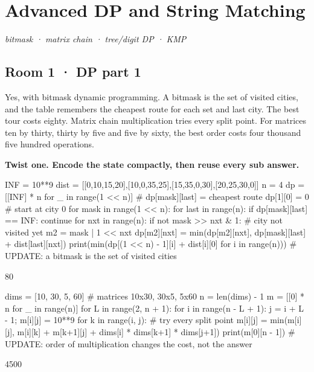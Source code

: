 \documentclass[11pt,a4paper]{report}
\begin{document}
\chapter{Advanced DP and String Matching}
\textit{bitmask · matrix chain · tree/digit DP · KMP}
\section*{Room 1 · DP part 1}
Yes, with bitmask dynamic programming. A bitmask is the set of visited cities, and the table remembers the cheapest route for each set and last city. The best tour costs eighty. Matrix chain multiplication tries every split point. For matrices ten by thirty, thirty by five and five by sixty, the best order costs four thousand five hundred operations.
\begin{tcolorbox}[colback=yellow!12,colframe=orange!70!black,boxrule=0.4pt,left=4pt,right=4pt,top=2pt,bottom=2pt]\textbf{Twist one. Encode the state compactly, then reuse every sub answer.}\end{tcolorbox}
\begin{Code}
INF = 10**9
dist = [[0,10,15,20],[10,0,35,25],[15,35,0,30],[20,25,30,0]]
n = 4
dp = [[INF] * n for _ in range(1 << n)]     # dp[mask][last] = cheapest route
dp[1][0] = 0                                # start at city 0
for mask in range(1 << n):
    for last in range(n):
        if dp[mask][last] == INF: continue
        for nxt in range(n):
            if not mask >> nxt & 1:         # city not visited yet
                m2 = mask | 1 << nxt
                dp[m2][nxt] = min(dp[m2][nxt], dp[mask][last] + dist[last][nxt])
print(min(dp[(1 << n) - 1][i] + dist[i][0] for i in range(n)))
# UPDATE: a bitmask is the set of visited cities
\end{Code}
\begin{Out}
80
\end{Out}
\begin{Code}
dims = [10, 30, 5, 60]                      # matrices 10x30, 30x5, 5x60
n = len(dims) - 1
m = [[0] * n for _ in range(n)]
for L in range(2, n + 1):
    for i in range(n - L + 1):
        j = i + L - 1; m[i][j] = 10**9
        for k in range(i, j):               # try every split point
            m[i][j] = min(m[i][j], m[i][k] + m[k+1][j] + dims[i] * dims[k+1] * dims[j+1])
print(m[0][n - 1])
# UPDATE: order of multiplication changes the cost, not the answer
\end{Code}
\begin{Out}
4500
\end{Out}
\end{document}
